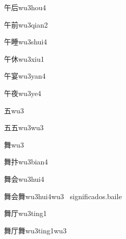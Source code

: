\begin{verbete}[4;6]{午后}{wu3hou4}
\end{verbete}

\begin{verbete}[4;9]{午前}{wu3qian2}
\end{verbete}

\begin{verbete}[4;14]{午睡}{wu3shui4}
\end{verbete}

\begin{verbete}[4;6]{午休}{wu3xiu1}
\end{verbete}

\begin{verbete}[4;10]{午宴}{wu3yan4}
\end{verbete}

\begin{verbete}[4;8]{午夜}{wu3ye4}
\end{verbete}

\begin{verbete}[4]{五}{wu3}
\end{verbete}

\begin{verbete}[4;4]{五五}{wu3wu3}
\end{verbete}

\begin{verbete}[14]{舞}{wu3}
\end{verbete}

\begin{verbete}[14;7]{舞抃}{wu3bian4}
\end{verbete}

\begin{verbete}[14;6]{舞会}{wu3hui4}
\end{verbete}

\begin{verbete}[14;6;14]{舞会舞}{wu3hui4wu3}
\ significado{s.}{baile}
\end{verbete}

\begin{verbete}[14;4]{舞厅}{wu3ting1}
\end{verbete}

\begin{verbete}[14;4;14]{舞厅舞}{wu3ting1wu3}
\end{verbete}

